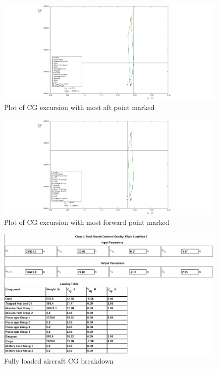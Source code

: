 \documentclass[conf]{new-aiaa}
\begin{document}
\begin{figure}[H]
    \includegraphics[width=\textwidth]{Report3Printouts/Cg/Cg_excursion_plot_mostaft_cropped.png}
    \caption{Plot of CG excursion with most aft point marked}
    \label{fig:cg_excursion_plot_mostaft}
\end{figure}


\begin{figure}[H]
    \includegraphics[width=\textwidth]{Report3Printouts/Cg/Cg_excursion_plot_mostforward_cropped.png}
    \caption{Plot of CG excursion with most forward point marked}
    \label{fig:cg_excursion_plot_mosforward}
\end{figure}

\begin{figure}[H]
    \includegraphics[width=\textwidth]{Report3Printouts/Cg/Cg_TotalAircraft_cropped.png}
    \caption{Fully loaded aircraft CG breakdown}
    \label{fig:cg_totalaircraft}
\end{figure}
\end{document}
